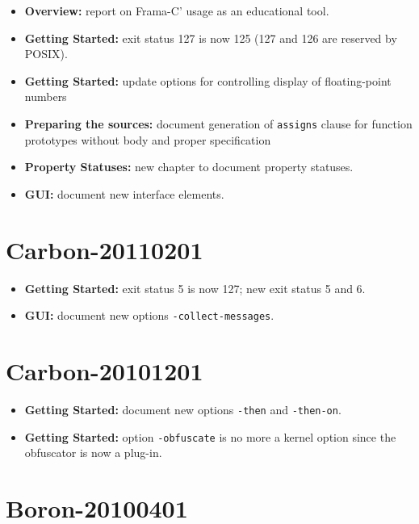 \begin{itemize}
\item \textbf{Overview:} report on Frama-C' usage as an educational tool.
\item \textbf{Getting Started:} exit status 127 is now 125 (127 and 126 are
reserved by POSIX).
\item \textbf{Getting Started:} update options for controlling display of
  floating-point numbers
\item \textbf{Preparing the sources:} document generation of \texttt{assigns}
  clause for function prototypes without body and proper specification
\item \textbf{Property Statuses:} new chapter to document property statuses.
\item \textbf{GUI:} document new interface elements.
\end{itemize}

\section*{Carbon-20110201}

\begin{itemize}
\item \textbf{Getting Started:} exit status 5 is now 127;
new exit status 5 and 6.
\item \textbf{GUI:} document new options \texttt{-collect-messages}.
\end{itemize}

\section*{Carbon-20101201}

\begin{itemize}
\item \textbf{Getting Started:} document new options \texttt{-then} and
  \texttt{-then-on}.
\item \textbf{Getting Started:} option \texttt{-obfuscate} is no more a kernel
  option since the obfuscator is now a plug-in.
\end{itemize}

\section*{Boron-20100401}

